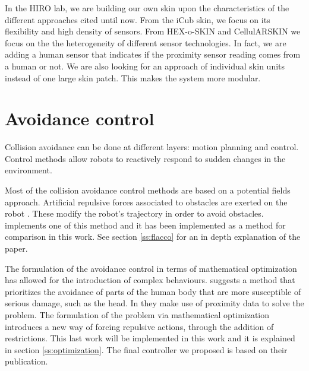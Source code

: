 In the HIRO lab, we are building our own skin upon the characteristics of the different approaches cited until now. From the iCub skin, we focus on its flexibility and high density of sensors. From HEX-o-SKIN and CellulARSKIN we focus on the the heterogeneity of different sensor technologies. In fact, we are adding a human sensor that indicates if the proximity sensor reading comes from a human or not. We are also looking for an approach of individual skin units instead of one large skin patch. This makes the system more modular.

\section{Avoidance control}
\label{s:relwork2}

Collision avoidance can be done at different layers: motion planning and control. Control methods allow robots to reactively respond to sudden changes in the environment.

Most of the collision avoidance control methods are based on a potential fields approach. Artificial repulsive forces associated to obstacles are exerted on the robot . These modify the robot's trajectory in order to avoid obstacles. \cite{flacco2012depth} implements one of this method and it has been implemented as a method for comparison in this work. See section \ref{ss:flacco} for an in depth explanation of the paper.

The formulation of the avoidance control in terms of mathematical optimization has allowed for the introduction of complex behaviours. \cite{nguyen2018compact} suggests a method that prioritizes the avoidance of parts of the human body that are more susceptible of serious damage, such as the head. In \cite{dingcollision} they make use of proximity data to solve the problem. The formulation of the problem via mathematical optimization introduces a new way of forcing repulsive actions, through the addition of restrictions. This last work will be implemented in this work and it is explained in section \ref{ss:optimization}. The final controller we proposed is based on their publication.

